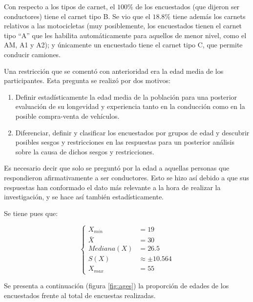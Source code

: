 Con respecto a los tipos de carnet, el $100\%$ de los encuestados (que dijeron ser
conductores) tiene el carnet tipo B. Se vio que el $18.8\%$ tiene además los
carnets relativos a las motocicletas (muy posiblemente, los encuestados tienen el
carnet tipo ``A'' que les habilita automáticamente para aquellos de menor nivel,
como el AM, A1 y A2); y únicamente un encuestado tiene el carnet tipo C, que permite
conducir camiones.

Una restricción que se comentó con anterioridad era la edad media de los participantes.
Esta pregunta se realizó por dos motivos:

\begin{enumerate}
  \item Definir estadísticamente la edad media de la población para una posterior evaluación
        de su longevidad y experiencia tanto en la conducción como en la posible
        compra-venta de vehículos.
  \item Diferenciar, definir y clasificar los encuestados por grupos de edad y descubrir
        posibles sesgos y restricciones en las respuestas para un posterior análisis
        sobre la causa de dichos sesgos y restricciones.
\end{enumerate}

Es necesario decir que solo se preguntó por la edad a aquellas personas que respondieron
afirmativamente a ser conductores. Esto se hizo así debido a que sus respuestas han
conformado el dato más relevante a la hora de realizar la investigación, y se hace así
también estadísticamente.

Se tiene pues que:

\begin{equation}\label{eq:ages}
  \left\{\begin{aligned}
    X_{min}               & = 19               \\
    \bar{X}               & = 30               \\
    Mediana\left(X\right) & = 26.5             \\
    S\left(X\right)       & \approx \pm 10.564 \\
    X_{max}               & = 55
  \end{aligned}\right.
\end{equation}

Se presenta a continuación (figura \ref{fig:ages}) la proporción de edades de los
encuestados frente al total de encuestas realizadas.

